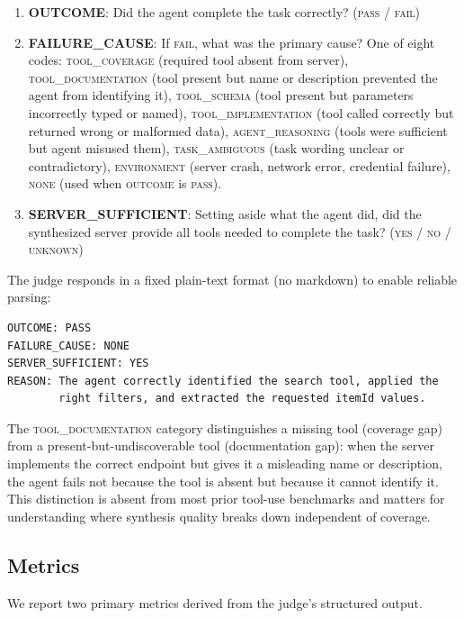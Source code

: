 \documentclass[12pt]{report}
\begin{document}
\begin{enumerate}
  \item \textbf{OUTCOME}: Did the agent complete the task correctly?
    (\textsc{pass} / \textsc{fail})
  \item \textbf{FAILURE\_CAUSE}: If \textsc{fail}, what was the primary cause?
    One of eight codes:
    \textsc{tool\_coverage} (required tool absent from server),
    \textsc{tool\_documentation} (tool present but name or description
    prevented the agent from identifying it),
    \textsc{tool\_schema} (tool present but parameters incorrectly typed
    or named),
    \textsc{tool\_implementation} (tool called correctly but returned wrong
    or malformed data),
    \textsc{agent\_reasoning} (tools were sufficient but agent misused them),
    \textsc{task\_ambiguous} (task wording unclear or contradictory),
    \textsc{environment} (server crash, network error, credential failure),
    \textsc{none} (used when \textsc{outcome} is \textsc{pass}).
  \item \textbf{SERVER\_SUFFICIENT}: Setting aside what the agent did,
    did the synthesized server provide all tools needed to complete the task?
    (\textsc{yes} / \textsc{no} / \textsc{unknown})
\end{enumerate}

\noindent
The judge responds in a fixed plain-text format (no markdown) to enable
reliable parsing:

\begin{verbatim}
OUTCOME: PASS
FAILURE_CAUSE: NONE
SERVER_SUFFICIENT: YES
REASON: The agent correctly identified the search tool, applied the
        right filters, and extracted the requested itemId values.
\end{verbatim}

\noindent
The \textsc{tool\_documentation} category distinguishes a missing tool
(coverage gap) from a present-but-undiscoverable tool (documentation gap):
when the server implements the correct endpoint but gives it a misleading
name or description, the agent fails not because the tool is absent but
because it cannot identify it. This distinction is absent from most prior
tool-use benchmarks and matters for understanding where synthesis quality
breaks down independent of coverage.

\subsection{Metrics}
\label{sec:metrics}

We report two primary metrics derived from the judge's structured output.
\end{document}
